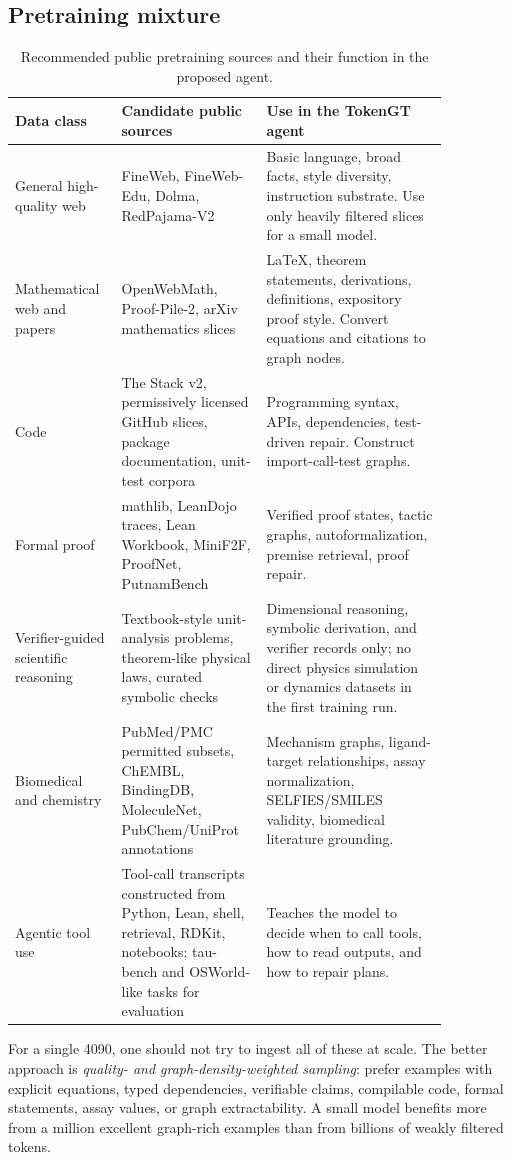 \documentclass[11pt]{article}
\newcommand{\1}{\mathbf{1}}
\begin{document}
\subsection{Pretraining mixture}

\begin{longtable}{p{0.18\linewidth}p{0.30\linewidth}p{0.38\linewidth}}
\caption{Recommended public pretraining sources and their function in the proposed agent.}\label{tab:pretrain-sources}\\
\toprule
Data class & Candidate public sources & Use in the TokenGT agent\\
\midrule
General high-quality web & FineWeb, FineWeb-Edu, Dolma, RedPajama-V2 & Basic language, broad facts, style diversity, instruction substrate. Use only heavily filtered slices for a small model.\\
Mathematical web and papers & OpenWebMath, Proof-Pile-2, arXiv mathematics slices & LaTeX, theorem statements, derivations, definitions, expository proof style. Convert equations and citations to graph nodes.\\
Code & The Stack v2, permissively licensed GitHub slices, package documentation, unit-test corpora & Programming syntax, APIs, dependencies, test-driven repair. Construct import-call-test graphs.\\
Formal proof & mathlib, LeanDojo traces, Lean Workbook, MiniF2F, ProofNet, PutnamBench & Verified proof states, tactic graphs, autoformalization, premise retrieval, proof repair.\\
Verifier-guided scientific reasoning & Textbook-style unit-analysis problems, theorem-like physical laws, curated symbolic checks & Dimensional reasoning, symbolic derivation, and verifier records only; no direct physics simulation or dynamics datasets in the first training run.\\
Biomedical and chemistry & PubMed/PMC permitted subsets, ChEMBL, BindingDB, MoleculeNet, PubChem/UniProt annotations & Mechanism graphs, ligand-target relationships, assay normalization, SELFIES/SMILES validity, biomedical literature grounding.\\
Agentic tool use & Tool-call transcripts constructed from Python, Lean, shell, retrieval, RDKit, notebooks; tau-bench and OSWorld-like tasks for evaluation & Teaches the model to decide when to call tools, how to read outputs, and how to repair plans.\\
\bottomrule
\end{longtable}

For a single 4090, one should not try to ingest all of these at scale. The better approach is \emph{quality- and graph-density-weighted sampling}: prefer examples with explicit equations, typed dependencies, verifiable claims, compilable code, formal statements, assay values, or graph extractability. A small model benefits more from a million excellent graph-rich examples than from billions of weakly filtered tokens.
\end{document}

